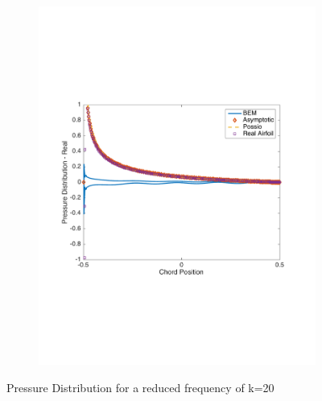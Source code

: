 \documentclass{article}
\begin{document}
\begin{figure}[h]
\begin{subfigure}{0.33\textwidth}
	\includegraphics[width = \textwidth, height=0.2\textheight]{pressure_k20real}
\end{subfigure}%
\caption{Pressure Distribution for a reduced frequency of k=20}
\end{figure}
\end{document}
